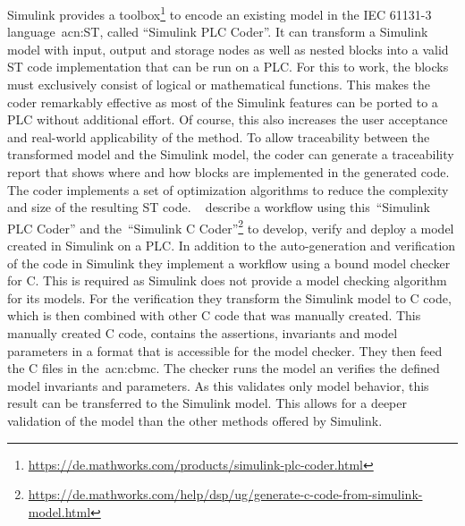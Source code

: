 Simulink provides a toolbox\footnote{\url{https://de.mathworks.com/products/simulink-plc-coder.html}} to encode an existing model in the IEC 61131-3 language~\acrshort{acn:ST}, called \enquote{Simulink PLC Coder}.
It can transform a Simulink model with input, output and storage nodes as well as nested blocks into a valid ST code implementation that can be run on a PLC.
For this to work, the blocks must exclusively consist of logical or mathematical functions.
This makes the coder remarkably effective as most of the Simulink features can be ported to a PLC without additional effort.
Of course, this also increases the user acceptance and real-world applicability of the method.
To allow traceability between the transformed model and the Simulink model, the coder can generate a traceability report that shows where and how blocks are implemented in the generated code.
The coder implements a set of optimization algorithms to reduce the complexity and size of the resulting ST code.
\citeauthor{7535242}~\cite{7535242} describe a workflow using this~\enquote{Simulink PLC Coder} and the~\enquote{Simulink C Coder}\footnote{\url{https://de.mathworks.com/help/dsp/ug/generate-c-code-from-simulink-model.html}} to develop, verify and deploy a model created in Simulink on a PLC.
In addition to the auto-generation and verification of the code in Simulink they implement a workflow using a bound model checker for C.
This is required as Simulink does not provide a model checking algorithm for its models.
For the verification they transform the Simulink model to C code, which is then combined with other C code that was manually created.
This manually created C code, contains the assertions, invariants and model parameters in a format that is accessible for the model checker.
They then feed the C files in the~\acrfull{acn:cbmc}.
The checker runs the model an verifies the defined model invariants and parameters.
As this validates only model behavior, this result can be transferred to the Simulink model.
This allows for a deeper validation of the model than the other methods offered by Simulink.

